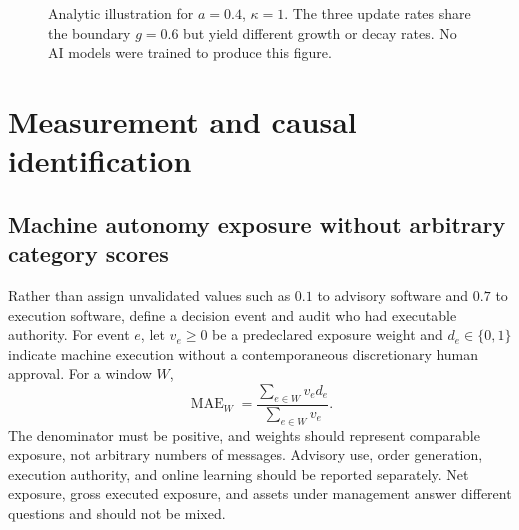 \documentclass[11pt,a4paper]{article}
\theoremstyle{definition}
\theoremstyle{remark}
\newcommand{\MAE}{\operatorname{MAE}}
\begin{document}
\begin{figure}[htbp]
\centering
{}
\caption{Analytic illustration for $a=0.4$, $\kappa=1$. The three update rates share the boundary $g=0.6$ but yield different growth or decay rates. No AI models were trained to produce this figure.}
\label{fig:boundary}
\end{figure}

\section{Measurement and causal identification}
\label{sec:measurement}
\subsection{Machine autonomy exposure without arbitrary category scores}
Rather than assign unvalidated values such as $0.1$ to advisory software and $0.7$ to execution software, define a decision event and audit who had executable authority. For event $e$, let $v_e\geq0$ be a predeclared exposure weight and $d_e\in\{0,1\}$ indicate machine execution without a contemporaneous discretionary human approval. For a window $W$,
\begin{equation}
 \MAE_W=\frac{\sum_{e\in W}v_e d_e}{\sum_{e\in W}v_e}.
 \label{eq:mae}
\end{equation}
The denominator must be positive, and weights should represent comparable exposure, not arbitrary numbers of messages. Advisory use, order generation, execution authority, and online learning should be reported separately. Net exposure, gross executed exposure, and assets under management answer different questions and should not be mixed.
\end{document}
